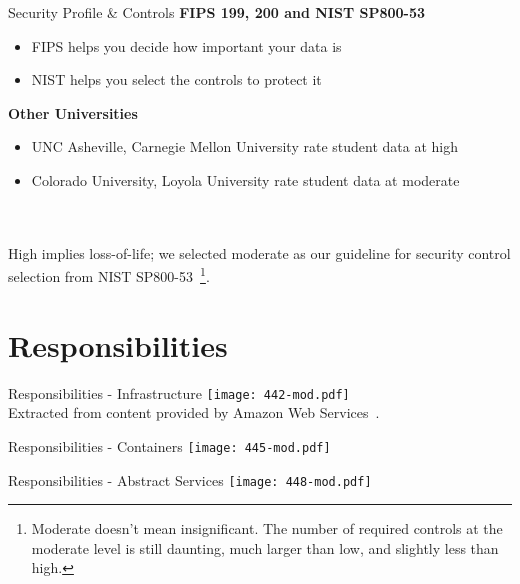 \documentclass[t,handout]{beamer}   %
\begin{document}
\begin{frame}{Security Profile \& Controls}
\textbf{FIPS 199, 200 and NIST SP800-53}
{\small
\begin{itemize}
\item FIPS helps you decide how important your data is
\item NIST helps you select the controls to protect it
\end{itemize}
}

\textbf{Other Universities}
{\small
\begin{itemize}
\item UNC Asheville, Carnegie Mellon University rate student data at high
\item Colorado University, Loyola University rate student data at moderate
\end{itemize}
}
~\\~\\
High implies loss-of-life; we selected moderate as our guideline for security control selection from NIST SP800-53~\footnote{Moderate doesn't mean insignificant. The number of required controls at the moderate level is still daunting, much larger than low, and slightly less than high.}.


\end{frame}

\section{Responsibilities}

\begin{frame}{Responsibilities - Infrastructure}
 	\texttt{[image: 442-mod.pdf]} \\
 	{\tiny Extracted from content provided by Amazon Web Services~.}
\end{frame}

\begin{frame}{Responsibilities - Containers}
 	\texttt{[image: 445-mod.pdf]}
\end{frame}

\begin{frame}{Responsibilities - Abstract Services}
 	\texttt{[image: 448-mod.pdf]}
\end{frame}
\end{document}
